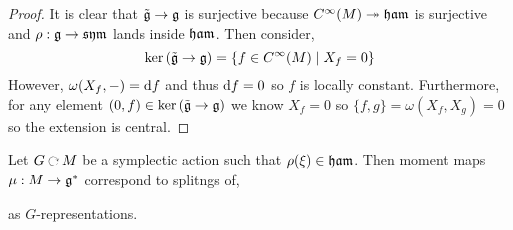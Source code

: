 \documentclass[12pt]{extarticle}
\newcommand{\R}{\mathbb{R}}
\begin{document}
\begin{proof}
It is clear that $\tilde{\mathfrak{g}} \to \mathfrak{g}$ is surjective because $C^\infty(M) \twoheadrightarrow \mathfrak{ham}$ is surjective and $\rho : \mathfrak{g} \to \mathfrak{sym}$ lands inside $\mathfrak{ham}$. Then consider,
\[ \ker{(\tilde{\mathfrak{g}} \to \mathfrak{g})} = \{ f \in C^\infty(M) \mid X_f = 0 \} \]
However, $\omega(X_f, -) = \mathrm{d}{f}$ and thus $\mathrm{d}{f} = 0$ so $f$ is locally constant. Furthermore, for any element $(0, f) \in \ker{(\tilde{\mathfrak{g}} \to \mathfrak{g})}$ we know $X_f = 0$ so $\{f, g \} = \omega(X_f, X_g) = 0$ so the extension is central.
\end{proof}

\begin{prop}
Let $G \acts M$ be a symplectic action such that $\rho(\xi) \in \mathfrak{ham}$. Then moment maps $\mu : M \to \mathfrak{g}^*$ correspond to splitngs of,
\begin{center}
\end{center}
as $G$-representations.
\end{prop}
\end{document}
